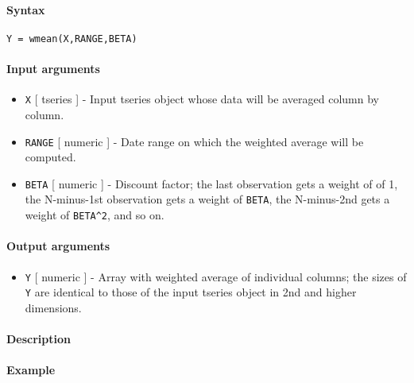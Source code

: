 


	\paragraph{Syntax}

\begin{verbatim}
Y = wmean(X,RANGE,BETA)
\end{verbatim}

\paragraph{Input arguments}

\begin{itemize}
\item
  \texttt{X} {[} tseries {]} - Input tseries object whose data will be
  averaged column by column.
\item
  \texttt{RANGE} {[} numeric {]} - Date range on which the weighted
  average will be computed.
\item
  \texttt{BETA} {[} numeric {]} - Discount factor; the last observation
  gets a weight of of 1, the N-minus-1st observation gets a weight of
  \texttt{BETA}, the N-minus-2nd gets a weight of \texttt{BETA\^{}2},
  and so on.
\end{itemize}

\paragraph{Output arguments}

\begin{itemize}
\itemsep1pt\parskip0pt
\item
  \texttt{Y} {[} numeric {]} - Array with weighted average of individual
  columns; the sizes of \texttt{Y} are identical to those of the input
  tseries object in 2nd and higher dimensions.
\end{itemize}

\paragraph{Description}

\paragraph{Example}


